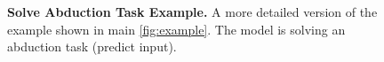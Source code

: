 \documentclass{article}
\begin{document}
\begin{figure}

    \caption{\textbf{Solve Abduction Task Example.} A more detailed version of the example shown in main \cref{fig:example}. The model is solving an abduction task (predict input).}
    \label{fig:pred_code_i_example}
\end{figure}
\end{document}

